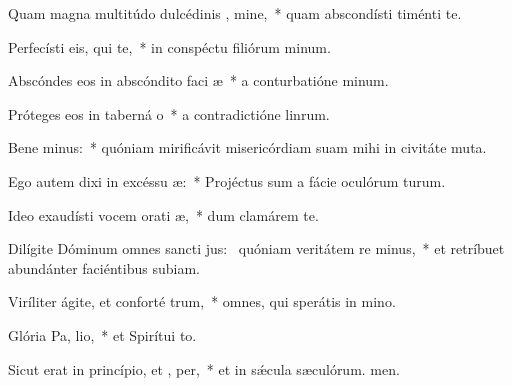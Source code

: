 \item Quam magna multitúdo dulcédinis , mine,~* quam abscondísti timénti te.
\item Perfecísti eis, qui   te,~* in conspéctu filiórum minum.
\item Abscóndes eos in abscóndito faci æ~* a conturbatióne minum.
\item Próteges eos in taberná o~* a contradictióne linrum.
\item Bene minus:~* quóniam mirificávit misericórdiam suam mihi in civitáte muta.
\item Ego autem dixi in excéssu  æ:~* Projéctus sum a fácie oculórum turum.
\item Ideo exaudísti vocem orati æ,~* dum clamárem  te.
\item Dilígite Dóminum omnes sancti jus:~\pscross{} quóniam veritátem re minus,~* et retríbuet abundánter faciéntibus subiam.
\item Viríliter ágite, et conforté  trum,~* omnes, qui sperátis in mino.
\item Glória Pa,  lio,~* et Spirítui to.
\item Sicut erat in princípio, et ,  per,~* et in sǽcula sæculórum. men.
